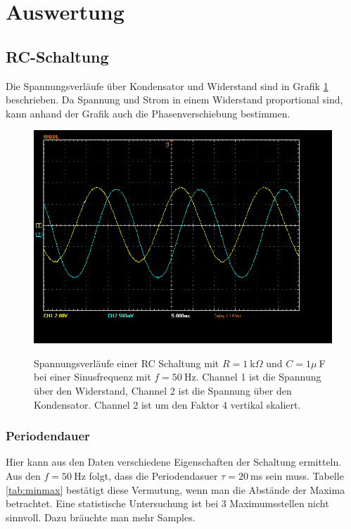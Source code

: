 \documentclass{article}
\begin{document}
\section{Auswertung}

\subsection{RC-Schaltung}

Die Spannungsverläufe über Kondensator und Widerstand sind in Grafik \ref{fig:schaltung1_sinus} beschrieben. Da Spannung und Strom in einem Widerstand proportional sind, kann anhand der Grafik auch die Phasenverschiebung bestimmen.


\begin{figure}[H]
\caption{Spannungsverläufe einer RC Schaltung mit $R=1~$k$\Omega$ und $C=1\mu~$F bei einer Sinusfrequenz mit $f=50~$Hz. Channel 1 ist die Spannung über den Widerstand, Channel 2 ist die Spannung über den Kondensator. Channel 2 ist um den Faktor 4 vertikal skaliert.}
\label{fig:schaltung1_sinus}
{\centering
\includegraphics[scale=0.4]{winkler/Schaltung_1_Sinus.png}}
\end{figure}

\subsubsection{Periodendauer}
Hier kann aus den Daten verschiedene Eigenschaften der Schaltung ermitteln. Aus den $f=50~$Hz folgt, dass die Periodendasuer $\tau = 20~$ms sein muss. Tabelle \ref{tab:minmax} bestätigt diese Vermutung, wenn man die Abstände der Maxima betrachtet. Eine statistische Untersuchung ist bei 3 Maximumsstellen nicht sinnvoll. Dazu bräuchte man mehr Samples.
\end{document}

